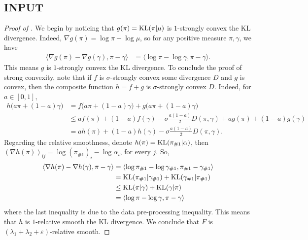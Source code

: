 \subsection{INPUT}
\begin{proof}[Proof of ]
We begin by noticing that $g(\pi) = \text{KL}(\pi | \mu)$ is $1$-strongly convex \wrt the KL divergence.
Indeed, $\nabla g(\pi) = \log \pi - \log \mu$, so for any positive measure $\pi, \gamma$, we have
\begin{align}
    \langle \nabla g(\pi) - \nabla g(\gamma), \pi - \gamma \rangle
    &= \langle
    \log \pi - \log \gamma, \pi - \gamma \rangle.
\end{align}
This means $g$ is $1$-strongly convex \wrt the KL divergence.
To conclude the proof of strong convexity, note that if $f$ is $\sigma$-strongly convex \wrt
some divergence $D$ and $g$ is convex, then the composite function $h = f + g$ is
$\sigma$-strongly convex \wrt $D$. Indeed, for $a \in [0,1]$,
\begin{align}
    h \big( a \pi + (1-a) \gamma \big)
    &= f \big( a \pi + (1-a) \gamma \big) + g \big( a \pi + (1-a) \gamma \big) \\
    &\leq a f(\pi) + (1 - a) f(\gamma) - \sigma \frac{a (1 - a)}{2} D(\pi, \gamma)
    + a g(\pi) + (1 - a) g(\gamma) \\
    &= a h(\pi) + (1 - a) h(\gamma) - \sigma \frac{a (1 - a)}{2} D(\pi, \gamma).
\end{align}
Regarding the relative smoothness, denote $h(\pi) = \text{KL}(\pi_{\#1} | \alpha)$,
then $(\nabla h(\pi))_{ij} = \log (\pi_{\#1})_i - \log \alpha_i$, for every $j$. So,
\begin{equation}
    \begin{split}
        \langle \nabla h(\pi) - \nabla h(\gamma), \pi - \gamma \rangle
    &= \langle
    \log \pi_{\# 1} - \log \gamma_{\# 1}, \pi_{\# 1} - \gamma_{\# 1} \rangle\\
    &= \text{KL}(\pi_{\# 1} | \gamma_{\# 1}) + \text{KL}(\gamma_{\# 1} | \pi_{\# 1}) \\
    &\leq \text{KL}(\pi | \gamma) + \text{KL}(\gamma | \pi) \\
    &= \langle \log \pi - \log \gamma, \pi - \gamma \rangle
    \end{split}
\end{equation}
where the last inequality is due to the data pre-processing inequality.
This means that $h$ is $1$-relative smooth \wrt the KL divergence.
We conclude that $F$ is $(\lambda_1 + \lambda_2 + \varepsilon)$-relative smooth.
\end{proof}


